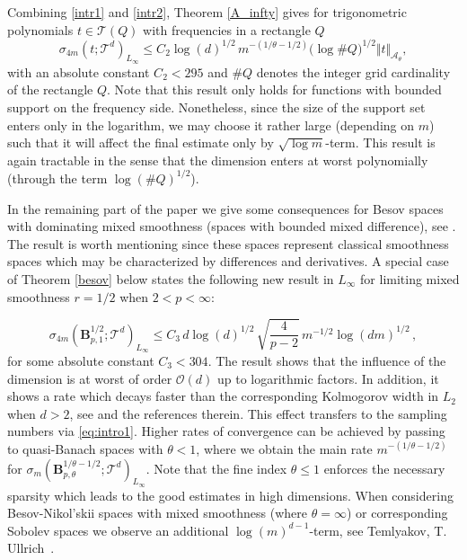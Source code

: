 \documentclass[11pt,reqno]{article}
\numberwithin{equation}{section}
\theoremstyle{definition}
\theoremstyle{plain}
\newcommand{\ca}{\ensuremath{\mathcal A}}
\newcommand{\be}{\begin{equation}}
\newcommand{\ee}{\end{equation}}
\begin{document}
 Combining \eqref{intr1} and \eqref{intr2}, Theorem \ref{A_infty} gives for trigonometric polynomials $t \in \mathcal{T}(Q)$ with frequencies in a rectangle $Q$ 
\be \label{intr3}
\sigma_{4m}(t;\mathcal{T}^d)_{L_\infty} \leq    C_2 \log(d)^{1/2}\, m^{-(1/\theta-1/2)} \big(\log {\# Q} \big)^{1/2}\Vert t\Vert_{\ca_\theta},
\ee %
with an absolute constant 
 \(C_2 < 295\) and \( {\# Q} \) denotes the integer grid cardinality of the rectangle $Q$. Note that this result only holds for functions with bounded support on the frequency side. Nonetheless, since the size of the support set enters only in the logarithm, we may choose it rather large (depending on $m$) such that it will affect the final estimate only by $\sqrt{\log m}$-term. This result is again tractable in the sense that the dimension enters at worst polynomially (through the term \(\log(\# Q)^{1/2}\)).

In the remaining part of the paper we give some consequences for Besov spaces with dominating mixed smoothness (spaces with bounded mixed difference), see \cite[Chapt.\ 3]{DuTeUl18}. The result is worth mentioning since these spaces represent classical smoothness spaces which may be characterized by differences and derivatives. A special case of Theorem \ref{besov} below states the following new result in $L_\infty$ for limiting mixed smoothness $r=1/2$ when $2<p<\infty$:

 \be\label{intr4}
 \sigma_{4m}(\mathbf{B}^{1/2}_{p,1};\mathcal{T}^d)_{L_\infty} \leq C_3\, d\log(d)^{1/2}\, \sqrt{\frac{4}{p-2}} \, m^{-1/2} \log(dm)^{1/2}\,,
 \ee %
 for some absolute constant \(C_3 <304\). The result shows that the influence of the dimension is at worst of order $\mathcal{O}(d)$ up to logarithmic factors. In addition, it shows a rate which decays faster than the corresponding Kolmogorov width in $L_2$ when $d>2$, see \cite[Thm.\ 4.5.3]{DuTeUl18} and the references therein. This effect transfers to the sampling numbers via \eqref{eq:intro1}. Higher rates of convergence can be achieved by passing to quasi-Banach spaces with $\theta < 1$, where we obtain the main rate $m^{-(1/\theta-1/2)}$ for $\sigma_{m}(\mathbf{B}^{1/\theta-1/2}_{p,\theta};\mathcal{T}^d)_{L_\infty}$. Note that the fine index $\theta\leq 1$ enforces the necessary sparsity which leads to the good estimates in high dimensions. When considering Besov-Nikol'skii spaces with mixed smoothness (where $\theta = \infty$) or corresponding Sobolev spaces we observe an additional $\log(m)^{d-1}$-term, see Temlyakov, T. Ullrich \cite{TeUl22}\,.      
\end{document}

